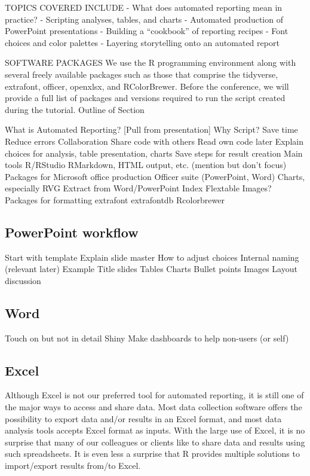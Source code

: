 \documentclass[
]{book}
\begin{document}
TOPICS COVERED INCLUDE
- What does automated reporting mean in practice?
- Scripting analyses, tables, and charts
- Automated production of PowerPoint presentations
- Building a ``cookbook'' of reporting recipes
- Font choices and color palettes
- Layering storytelling onto an automated report

SOFTWARE PACKAGES
We use the R programming environment along with several freely available packages such as those that comprise the tidyverse, extrafont, officer, openxlsx, and RColorBrewer. Before the conference, we will provide a full list of packages and versions required to run the script created during the tutorial.
Outline of Section

What is Automated Reporting? {[}Pull from presentation{]}
Why Script?
Save time
Reduce errors
Collaboration
Share code with others
Read own code later
Explain choices for analysis, table presentation, charts
Save steps for result creation
Main tools
R/RStudio
RMarkdown, HTML output, etc. (mention but don't focus)
Packages for Microsoft office production
Officer suite (PowerPoint, Word)
Charts, especially RVG
Extract from Word/PowerPoint
Index
Flextable
Images?
Packages for formatting
extrafont
extrafontdb
Rcolorbrewer

\hypertarget{powerpoint-workflow}{%
\subsection{PowerPoint workflow}\label{powerpoint-workflow}}

Start with template
Explain slide master
How to adjust choices
Internal naming (relevant later)
Example
Title slides
Tables
Charts
Bullet points
Images
Layout discussion

\hypertarget{word-1}{%
\subsection{Word}\label{word-1}}

Touch on but not in detail
Shiny
Make dashboards to help non-users (or self)

\hypertarget{excel-1}{%
\subsection{Excel}\label{excel-1}}

Although Excel is not our preferred tool for automated reporting, it is still one of the major ways to access and share data. Most data collection software offers the possibility to export data and/or results in an Excel format, and most data analysis tools accepts Excel format as inputs. With the large use of Excel, it is no surprise that many of our colleagues or clients like to share data and results using such spreadsheets. It is even less a surprise that R provides multiple solutions to import/export results from/to Excel.
\end{document}
